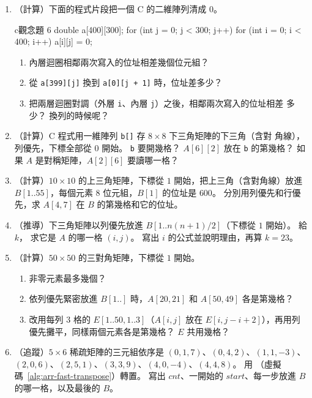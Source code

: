 \begin{enumerate}
\item （計算）下面的程式片段把一個 C 的二維陣列清成 $0$。
\begin{code}{c}{觀念題 6}
double a[400][300];
for (int j = 0; j < 300; j++)
    for (int i = 0; i < 400; i++)
        a[i][j] = 0;
\end{code}
\begin{enumerate}
\item 內層迴圈相鄰兩次寫入的位址相差幾個位元組？
\item 從 \texttt{a[399][j]} 換到 \texttt{a[0][j + 1]} 時，位址差多少？
\item 把兩層迴圈對調（外層 \texttt{i}、內層 \texttt{j}）之後，相鄰兩次寫入的位址相差
多少？ 換列的時候呢？
\end{enumerate}

\item （計算）C 程式用一維陣列 \texttt{b[]} 存 $8 \times 8$ 下三角矩陣的下三角（含對
角線），列優先，下標全部從 $0$ 開始。 \texttt{b} 要開幾格？ $A[6][2]$ 放在
\texttt{b} 的第幾格？ 如果 $A$ 是對稱矩陣，$A[2][6]$ 要讀哪一格？

\item （計算）$10 \times 10$ 的上三角矩陣，下標從 $1$ 開始，把上三角（含對角線）放進
$B[1..55]$，每個元素 $8$ 位元組，$B[1]$ 的位址是 $600$。 分別用列優先和行優先，求
$A[4, 7]$ 在 $B$ 的第幾格和它的位址。

\item （推導）下三角矩陣以列優先放進 $B[1..n(n+1)/2]$（下標從 $1$ 開始）。 給 $k$，
求它是 $A$ 的哪一格 $(i, j)$。 寫出 $i$ 的公式並說明理由，再算 $k = 23$。

\item （計算）$50 \times 50$ 的三對角矩陣，下標從 $1$ 開始。
\begin{enumerate}
\item 非零元素最多幾個？
\item 依列優先緊密放進 $B[1..]$ 時，$A[20, 21]$ 和 $A[50, 49]$ 各是第幾格？
\item 改用每列 $3$ 格的 $E[1..50, 1..3]$（$A[i, j]$ 放在 $E[i, j - i + 2]$），再用列
優先攤平，同樣兩個元素各是第幾格？ $E$ 共用幾格？
\end{enumerate}

\item （追蹤）$5 \times 6$ 稀疏矩陣的三元組依序是
$(0,1,7)$、$(0,4,2)$、$(1,1,-3)$、$(2,0,6)$、$(2,5,1)$、$(3,3,9)$、$(4,0,-4)$、$(4,4,8)$。 用
（虛擬碼~\ref{alg:arr-fast-transpose}）轉置。 寫出
$\mathit{cnt}$、一開始的 $\mathit{start}$、每一步放進 $B$ 的哪一格，以及最後的 $B$。


\end{enumerate}
